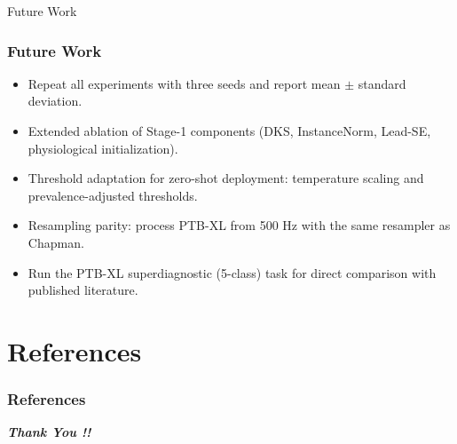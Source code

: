 \documentclass[serif, aspectratio=169]{beamer}
\begin{document}
\begin{frame}{Future Work}
	\frametitle<presentation>{Future Work}
	\begin{itemize}
		\item Repeat all experiments with three seeds and report mean $\pm$ standard deviation.
		\item Extended ablation of Stage-1 components (DKS, InstanceNorm, Lead-SE, physiological initialization).
		\item Threshold adaptation for zero-shot deployment: temperature scaling and prevalence-adjusted thresholds.
		\item Resampling parity: process PTB-XL from 500 Hz with the same resampler as Chapman.
		\item Run the PTB-XL superdiagnostic (5-class) task for direct comparison with published literature.
	\end{itemize}
\end{frame}

\section*{References}

\begin{frame}[allowframebreaks]
	\frametitle<presentation>{References}
	
	
\end{frame}


\begin{frame}\vspace{0.6in}
	\centering
	\fontsize{60 pt}{1}\textit{\textbf{Thank You !!}}\\ \vspace{1in}
	\centering
	\fontsize{20 pt}{1}
\end{frame}
\end{document}
